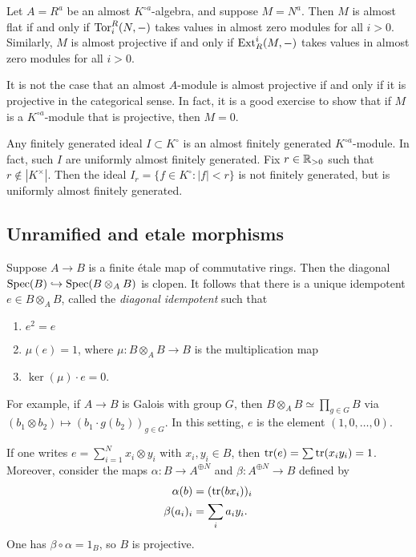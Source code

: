 Let $A=R^a$ be an almost $K^{\circ a}$-algebra, and suppose $M=N^a$. Then $M$ is 
almost flat if and only if $\operatorname{Tor}_i^R(N,-)$ takes values in almost zero 
modules for all $i>0$. Similarly, $M$ is almost projective if and only if 
$\operatorname{Ext}_R^i(M,-)$ takes values in almost zero modules for all $i>0$. 

It is not the case that an almost $A$-module is almost projective if and only 
if it is projective in the categorical sense. In fact, it is a good exercise to 
show that if $M$ is a $K^{\circ a}$-module that is projective, then $M=0$. 

Any finitely generated ideal $I\subset K^\circ$ is an almost finitely generated 
$K^{\circ a}$-module. In fact, such $I$ are uniformly almost finitely generated. 
Fix $r\in \mathbb{R}_{>0}$ such that $r\notin |K^\times|$. Then the ideal 
$I_r=\{f\in K^\circ:|f|<r\}$ is not finitely generated, but is uniformly almost 
finitely generated. 






\subsection{Unramified and etale morphisms}

Suppose $A\to B$ is a finite \'etale map of commutative rings. Then the 
diagonal $\operatorname{Spec}(B)\hookrightarrow \operatorname{Spec}(B\otimes_A B)$ is clopen. It follows 
that there is a unique idempotent $e\in B\otimes_A B$, called the \emph{diagonal 
idempotent} such that 
\begin{enumerate}
  \item $e^2=e$ 
  \item $\mu(e)=1$, where $\mu:B\otimes_A B\to B$ is the multiplication map 
  \item $\ker(\mu)\cdot e = 0$. 
\end{enumerate}

For example, if $A\to B$ is Galois with group $G$, then 
$B\otimes_A B\simeq \prod_{g\in G} B$ via 
$(b_1\otimes b_2)\mapsto (b_1\cdot g(b_2))_{g\in G}$. In this setting, $e$ is the 
element $(1,0,\dots,0)$. 

If one writes $e=\sum_{i=1}^N x_i\otimes y_i$ with $x_i,y_i\in B$, then 
$\operatorname{tr}(e) = \sum \operatorname{tr}(x_i y_i) = 1$. Moreover, consider the maps 
$\alpha:B\to A^{\oplus N}$ and $\beta:A^{\oplus N} \to B$ defined by 
\begin{align*}
  \alpha(b) &= (\operatorname{tr}(b x_i))_i \\
  \beta(a_i)_i &= \sum_i a_i y_i .
\end{align*}
One has $\beta\circ\alpha = 1_B$, so $B$ is projective. 




